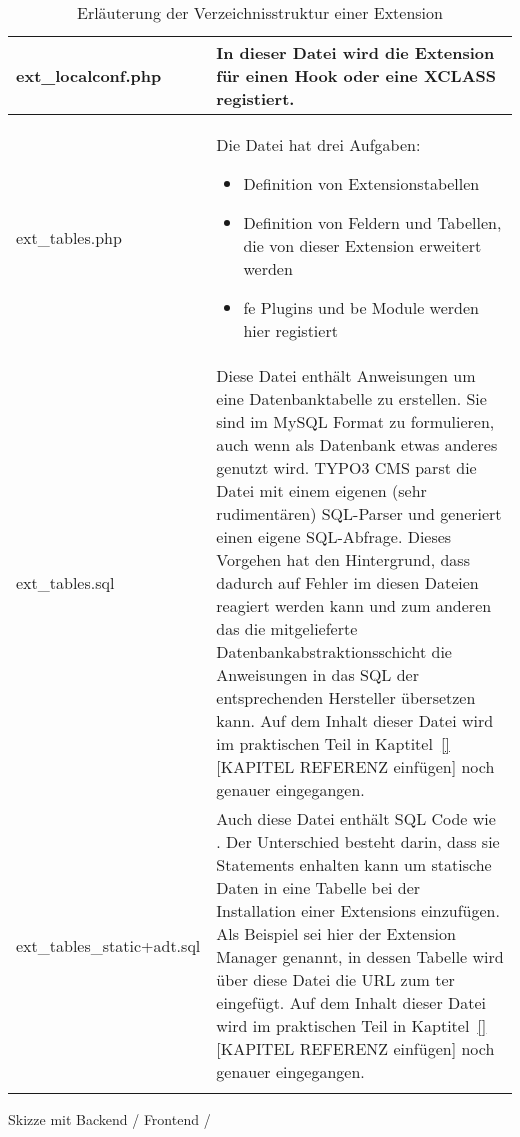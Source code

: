 \begin{longtable}{|l|p{}|}
	ext\_localconf.php & In dieser Datei wird die Extension für einen Hook oder eine XCLASS registiert.\\ \hline
	ext\_tables.php & Die Datei hat drei Aufgaben:
	\begin{itemize}
	\item Definition von Extensionstabellen
	\item Definition von Feldern und Tabellen, die von dieser Extension erweitert werden
	\item \gls{fe} Plugins und \gls{be} Module werden hier registiert
	\end{itemize}
	\\ \hline
	ext\_tables.sql & Diese Datei enthält Anweisungen um eine Datenbanktabelle zu erstellen. Sie sind im MySQL Format zu formulieren, auch wenn als Datenbank etwas anderes genutzt wird. TYPO3 CMS parst die Datei mit einem eigenen (sehr rudimentären) SQL-Parser und generiert einen eigene SQL-Abfrage. Dieses Vorgehen hat den Hintergrund, dass dadurch auf Fehler im diesen Dateien reagiert werden kann und zum anderen das die mitgelieferte Datenbankabstraktionsschicht die Anweisungen in das SQL der entsprechenden Hersteller übersetzen kann. Auf dem Inhalt dieser Datei wird im praktischen Teil in Kaptitel~\ref{} [KAPITEL REFERENZ einfügen] noch genauer eingegangen.\\ \hline
	ext\_tables\_static+adt.sql & Auch diese Datei enthält SQL Code wie \pdf{ext\_tables.sql}. Der Unterschied besteht darin, dass sie \pdf{INSERT} Statements enhalten kann um statische Daten in eine Tabelle bei der Installation einer Extensions einzufügen. Als Beispiel sei hier der Extension Manager genannt, in dessen Tabelle wird über diese Datei die URL zum \gls{ter} eingefügt. Auf dem Inhalt dieser Datei wird im praktischen Teil in Kaptitel~\ref{} [KAPITEL REFERENZ einfügen] noch genauer eingegangen.\\ \hline
	\caption{Erläuterung der Verzeichnisstruktur einer Extension}
	\label{tab:extensionFolderStructure}
\end{longtable}

Skizze mit Backend / Frontend / 
